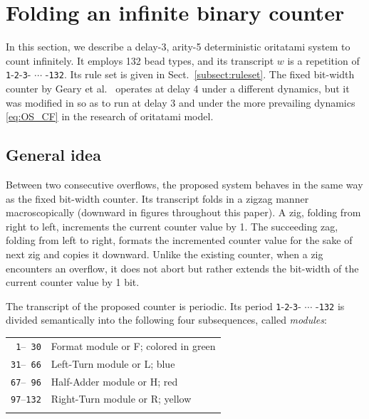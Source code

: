 \documentclass[twocolumn]{svjour3}
\begin{document}
	\section{Folding an infinite binary counter}
	\label{sect:detail}

In this section, we describe a delay-3, arity-5 deterministic oritatami system to count infinitely. 
It employs 132 bead types, and its transcript $w$ is a repetition of \texttt{1}-\texttt{2}-\texttt{3}- $\cdots$ -\texttt{132}. 
Its rule set is given in Sect.~\ref{subsect:ruleset}. 
The fixed bit-width counter by Geary et al.~\cite{GeMeScSe2019} operates at delay 4 under a different dynamics, but it was modified in \cite{MasudaSekiUbukata2018} so as to run at delay 3 and under the more prevailing dynamics \eqref{eq:OS_CF} in the research of oritatami model. 

\subsection{General idea}
Between two consecutive overflows, the proposed system behaves in the same way as the fixed bit-width counter.
Its transcript folds in a zigzag manner macroscopically (downward in figures throughout this paper).
A zig, folding from right to left, increments the current counter value by 1.
The succeeding zag, folding from left to right, formats the incremented counter value for the sake of next zig and copies it downward.
Unlike the existing counter, when a zig encounters an overflow, it does not abort but rather extends the bit-width of the current counter value by 1 bit.



The transcript of the proposed counter is periodic.
Its period \texttt{1}-\texttt{2}-\texttt{3}- $\cdots$ -\texttt{132} is divided semantically into the following four subsequences, called \textit{modules}: \\
\begin{tabular}{rl}
\\
\texttt{ 1}--\texttt{ 30} & Format module or F; colored in green \\
\texttt{31}--\texttt{ 66} & Left-Turn module or L; blue \\
\texttt{67}--\texttt{ 96} & Half-Adder module or H; red \\
\texttt{97}--\texttt{132} & Right-Turn module  or R; yellow \\
\\
\end{tabular}
\end{document}

